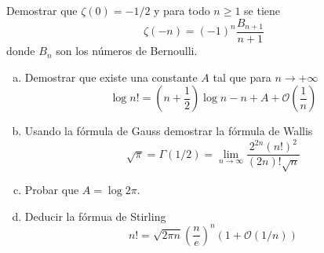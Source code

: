\documentclass[twoside]{article}
\begin{document}
\newpage
\begin{ejercicio}{8}
Demostrar que $ζ(0) = -1/2$ y para todo $n≥1$ se tiene
\[ ζ(-n) = (-1)^n \frac{B_{n+1}}{n+1} \]
donde $B_n$ son los números de Bernoulli.
\end{ejercicio}
\begin{solucion}
\end{solucion}

\newpage
\begin{ejercicio}{9}
\begin{enumerate}[(a)]
	\item Demostrar que existe una constante $A$ tal que para $n \to +∞$
	\[ \log n! = \left(n+\frac{1}{2}\right)\log n - n + A + \mathcal{O}\left(\frac{1}{n}\right)\]
	
	\item Usando la fórmula de Gauss demostrar la fórmula de Wallis
	\[ \sqrt{π} = Γ(1/2) = \lim_{n\to∞} \frac{2^{2n}(n!)^2}{(2n)!\sqrt{n}} \]
	
	\item Probar que $A = \log {2π}$.
	\item Deducir la fórmua de Stirling
	\[ n! = \sqrt{2πn} \left(\frac{n}{e}\right)^n (1 + \mathcal{O}(1/n)) \]
\end{enumerate}
\end{ejercicio}
\begin{solucion}
\end{solucion}
\end{document}
